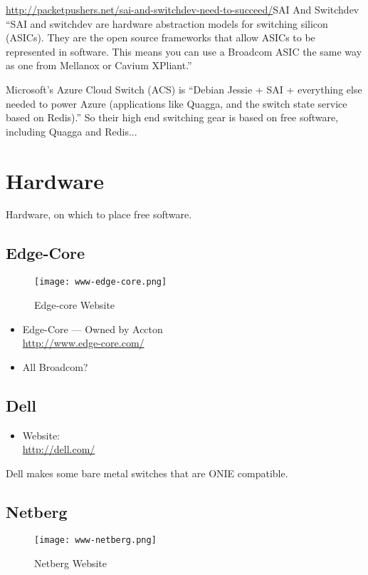 \url{http://packetpushers.net/sai-and-switchdev-need-to-succeed/}{SAI And Switchdev}
``SAI and switchdev are hardware abstraction models for switching silicon (ASICs). They are the open source frameworks that allow ASICs to be represented in software. This means you can use a Broadcom ASIC the same way as one from Mellanox or Cavium XPliant.''

Microsoft's Azure Cloud Switch (ACS) is ``Debian Jessie + SAI + everything else needed to power Azure (applications like Quagga, and the switch state service based on Redis).'' So their high end switching gear is based on free software, including Quagga and Redis...


\section{Hardware}
Hardware, on which to place free software.


\subsection{Edge-Core}
\begin{figure}[h!]
\texttt{[image: www-edge-core.png]}
 \caption{Edge-core Website}
 \label{fig:www-edge-core}
\end{figure}


\begin{itemize}
 \item Edge-Core --- Owned by Accton \\ \url{http://www.edge-core.com/}
 \item All Broadcom?
\end{itemize}


\subsection{Dell}
\begin{itemize}
 \item Website: \\ \url{http://dell.com/}
\end{itemize}

Dell makes some bare metal switches that are ONIE compatible.


\subsection{Netberg}
\begin{figure}[h!]
\texttt{[image: www-netberg.png]}
 \caption{Netberg Website}
 \label{fig:www-netberg}
\end{figure}


